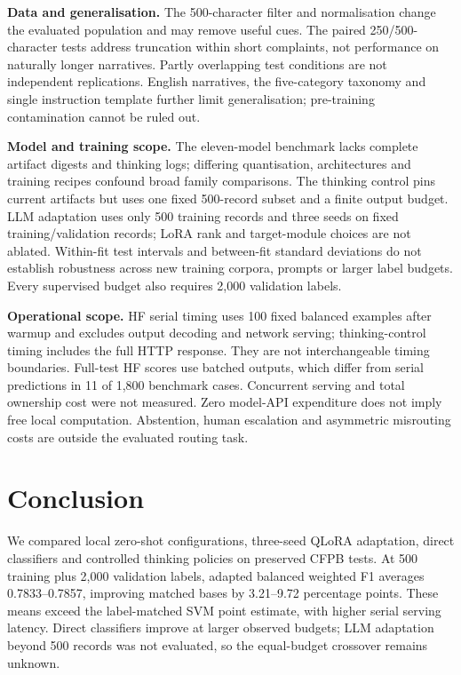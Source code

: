 \documentclass[pdflatex,sn-mathphys-num]{sn-jnl}
\begin{document}
\textbf{Data and generalisation.} The 500-character filter and
normalisation change the evaluated population and may remove useful
cues. The paired 250/500-character tests address truncation within
short complaints, not performance on naturally longer narratives.
Partly overlapping test conditions are not independent replications.
English narratives, the five-category taxonomy and single instruction
template further limit generalisation;
pre-training contamination cannot be ruled out.

\textbf{Model and training scope.} The eleven-model benchmark lacks
complete artifact digests and thinking logs; differing quantisation,
architectures and training recipes confound broad family comparisons.
The thinking
control pins current artifacts but uses one fixed 500-record subset
and a finite output budget. LLM adaptation uses only 500 training
records and three seeds on fixed training/validation records; LoRA rank
and target-module choices are not ablated. Within-fit test intervals and between-fit
standard deviations do not establish robustness across new training
corpora, prompts or larger label budgets. Every supervised budget
also requires 2,000 validation labels.

\textbf{Operational scope.} HF serial timing uses 100 fixed balanced
examples after warmup and excludes output decoding and network
serving; thinking-control timing includes the full HTTP response.
They are not interchangeable timing boundaries. Full-test HF scores
use batched outputs, which differ from serial predictions in 11 of
1,800 benchmark cases. Concurrent serving and total ownership cost
were not measured. Zero model-API expenditure does not imply free
local computation. Abstention, human escalation and asymmetric
misrouting costs are outside the evaluated routing task.

\section{Conclusion}
\label{sec:conclusion}

We compared local zero-shot configurations, three-seed QLoRA
adaptation, direct classifiers and controlled thinking policies on
preserved CFPB tests. At 500 training plus 2,000 validation labels,
adapted balanced weighted F1 averages 0.7833--0.7857, improving matched
bases by 3.21--9.72 percentage points. These means exceed the
label-matched SVM point estimate, with higher serial serving latency.
Direct classifiers improve at larger observed budgets; LLM adaptation
beyond 500 records was not evaluated, so the equal-budget crossover
remains unknown.
\end{document}

